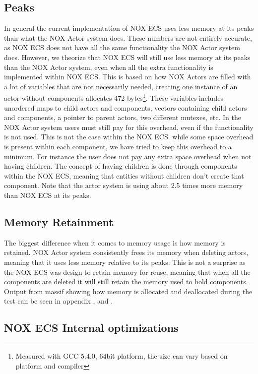 \subsection{Peaks}
In general the current implementation of NOX ECS uses less memory at its peaks than what the NOX Actor system does.
These numbers are not entirely accurate, as NOX ECS does not have all the same functionality the NOX Actor system does.
However, we theorize that NOX ECS will still use less memory at its peaks than the NOX Actor system, even when
all the extra functionality is implemented within NOX ECS.
This is based on how NOX Actors are filled with a lot of variables that are not necessarily needed,
creating one instance of an actor without components allocates 472 bytes\footnote{Measured with GCC 5.4.0, 64bit platform, the size can vary based on platform and compiler}.
These variables includes unordered maps to child actors and components, vectors containing child actors and components,
a pointer to parent actors, two different mutexes, etc.
In the NOX Actor system users must still pay for this overhead, even if the functionality is not used.
This is not the case within the NOX ECS.
while some space overhead is present within each component, we have tried to keep this overhead to a minimum.
For instance the user does not pay any extra space overhead when not having children.
The concept of having children is done through components within the NOX ECS, meaning that entities without children
don't create that component.
Note that the actor system is using about 2.5 times more memory than NOX ECS at its peaks.

\subsection{Memory Retainment}
The biggest difference when it comes to memory usage is how memory is retained.
NOX Actor system consistently frees its memory when deleting actors, meaning that it uses less memory relative to its peaks.
This is not a surprise as the NOX ECS was design to retain memory for reuse, meaning that when all the components are deleted
it will still retain the memory used to hold components.
Output from massif showing how memory is allocated and deallocated during the test can be seen in appendix ,
and .

\subsection{NOX ECS Internal optimizations}

